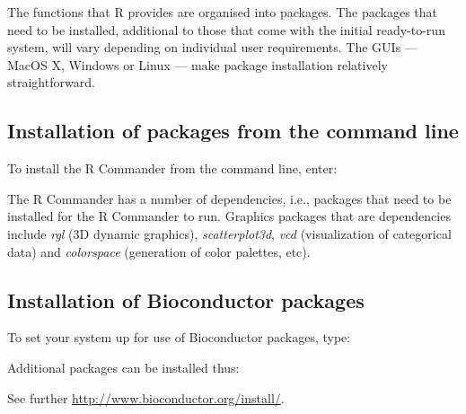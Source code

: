 The functions that R provides are organised into packages.  The
packages that need to be installed, additional to those that come with
the initial ready-to-run system, will vary depending on individual
user requirements.  The GUIs --- MacOS X, Windows or Linux --- make
package installation relatively straightforward.

\subsection*{Installation of packages from the command line}

To install the R Commander from the command line, enter:
\begin{knitrout}
\color{fgcolor}\begin{kframe}
\begin{alltt}
\hlstd{(}\hlstd{,} \hlstd{=}\hlstd{)}
\end{alltt}
\end{kframe}
\end{knitrout}
The R Commander has a number of dependencies, i.e., packages that
need to be installed for the R Commander to run.  Graphics packages
that are dependencies include \textit{rgl} (3D dynamic graphics),
\textit{scatterplot3d}, \textit{vcd} (visualization of categorical
data) and \textit{colorspace} (generation of color palettes, etc).

\subsection*{Installation of Bioconductor packages}
  To set your system up for use of
Bioconductor packages, type:
\begin{knitrout}
\color{fgcolor}\begin{kframe}
\begin{alltt}
\hlstd{(}\hlstd{)}
\hlstd{()}
\end{alltt}
\end{kframe}
\end{knitrout}
Additional packages can be installed thus:
\begin{knitrout}
\color{fgcolor}\begin{kframe}
\begin{alltt}
\hlstd{(}\hlstd{(}\hlstd{,} \hlstd{))}
\end{alltt}
\end{kframe}
\end{knitrout}
See further \url{http://www.bioconductor.org/install/}.

